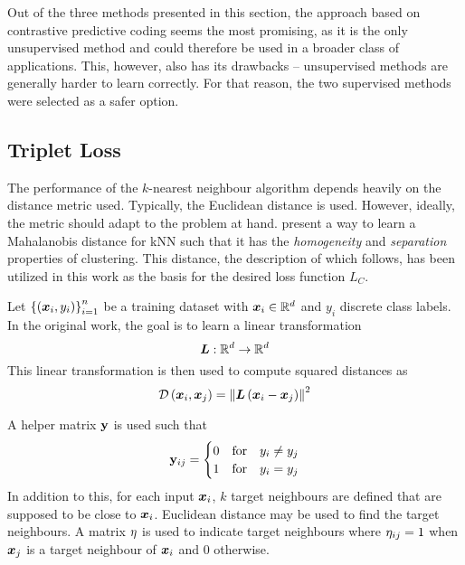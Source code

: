 Out of the three methods presented in this section, the approach based on contrastive predictive coding seems the most promising, as it is the only unsupervised method and could therefore be used in a broader class of applications. This, however, also has its drawbacks -- unsupervised methods are generally harder to learn correctly. For that reason, the two supervised methods were selected as a safer option.

\subsection{Triplet Loss}
The performance of the \( k \)-nearest neighbour algorithm depends heavily on the distance metric used. Typically, the Euclidean distance is used. However, ideally, the metric should adapt to the problem at hand. \cite{weinberger_distance_2006} present a way to learn a Mahalanobis distance for kNN such that it has the \textit{homogeneity} and \textit{separation} properties of clustering. This distance, the description of which follows, has been utilized in this work as the basis for the desired loss function \( L_C \).

Let \( \left\{ \left( \bm{x}_i, y_i \right) \right\}_{i = 1}^n \) be a training dataset with \( \bm{x}_i \in \mathbb{R}^d \) and \( y_i \) discrete class labels. In the original work, the goal is to learn a linear transformation
\[ \bm{L} : \mathbb{R}^d \to \mathbb{R}^d \]
This linear transformation is then used to compute squared distances as
\[ \mathcal{D} \left( \bm{x}_i, \bm{x}_j \right) = \left\lVert \bm{L} \left( \bm{x}_i - \bm{x}_j \right) \right\rVert^2 \]

A helper matrix \( \mathbf{y} \) is used such that
\[ \mathbf{y}_{ij} = \begin{cases}
	0 &\text{for} \quad y_i \neq y_j \\
	1 &\text{for} \quad y_i = y_j \\
\end{cases} \]
In addition to this, for each input \( \bm{x}_i \), \( k \) target neighbours are defined that are supposed to be close to \( \bm{x}_i \). Euclidean distance may be used to find the target neighbours. A matrix \( \mathbf{\eta} \) is used to indicate target neighbours where \( \mathbf{\eta}_{ij} = 1 \) when \( \bm{x}_j \) is a target neighbour of \( \bm{x}_i \) and \( 0 \) otherwise.

